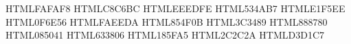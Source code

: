 \definecolor{promptbg}     {HTML}{FAFAF8}
\definecolor{promptborder} {HTML}{C8C6BC}
\definecolor{headerbg}     {HTML}{EEEDFE}
\definecolor{headerborder} {HTML}{534AB7}
\definecolor{exbg}         {HTML}{E1F5EE}
\definecolor{exborder}     {HTML}{0F6E56}
\definecolor{querybg}      {HTML}{FAEEDA}
\definecolor{queryborder}  {HTML}{854F0B}
\definecolor{rolecolor}    {HTML}{3C3489}
\definecolor{commentcolor} {HTML}{888780}
\definecolor{excolor}      {HTML}{085041}
\definecolor{querycolor}   {HTML}{633806}
\definecolor{keycolor}     {HTML}{185FA5}
\definecolor{valcolor}     {HTML}{2C2C2A}
\definecolor{divcolor}     {HTML}{D3D1C7}

\newcommand{\sectionpill}[4]{%
  \tikz[baseline=-0.6ex]\node[
    rectangle, rounded corners=3pt,
    fill=#1, draw=#2, line width=0.4pt,
    inner xsep=5pt, inner ysep=2pt,
    font=\scriptsize\bfseries, text=#4
  ] {#3};%
}

\newlength{\promptwidth}
\setlength{\promptwidth}{13.0cm}

\newlength{\bodywidth}
\setlength{\bodywidth}{12.32cm}

\newcommand{\promptrule}{%
  \textcolor{divcolor}{\rule{\bodywidth}{0.3pt}}%
}

